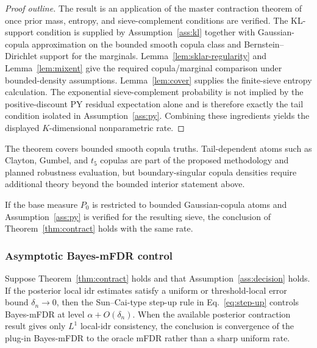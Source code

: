 \begin{proof}[Proof outline]
The result is an application of the master contraction theorem of \citet{GhosalvdV2017} once prior mass, entropy, and sieve-complement conditions are verified. The KL-support condition is supplied by Assumption~\ref{ass:kl} together with Gaussian-copula approximation on the bounded smooth copula class and Bernstein--Dirichlet support for the marginals. Lemma~\ref{lem:sklar-regularity} and Lemma~\ref{lem:mixent} give the required copula/marginal comparison under bounded-density assumptions. Lemma~\ref{lem:cover} supplies the finite-sieve entropy calculation. The exponential sieve-complement probability is not implied by the positive-discount PY residual expectation alone and is therefore exactly the tail condition isolated in Assumption~\ref{ass:py}. Combining these ingredients yields the displayed $K$-dimensional nonparametric rate.
\end{proof}

\begin{remark}
\label{rem:bounded-scope}
The theorem covers bounded smooth copula truths. Tail-dependent atoms such as Clayton, Gumbel, and $t_5$ copulas are part of the proposed methodology and planned robustness evaluation, but boundary-singular copula densities require additional theory beyond the bounded interior statement above.
\end{remark}

\begin{corollary}
\label{cor:gauss-only}
If the base measure $P_0$ is restricted to bounded Gaussian-copula atoms and Assumption~\ref{ass:py} is verified for the resulting sieve, the conclusion of Theorem~\ref{thm:contract} holds with the same rate.
\end{corollary}

\subsubsection{Asymptotic Bayes-mFDR control}

\begin{theorem}
\label{thm:fdr}
Suppose Theorem~\ref{thm:contract} holds and that Assumption~\ref{ass:decision} holds. If the posterior local idr estimates satisfy a uniform or threshold-local error bound $\delta_n\to0$, then the Sun--Cai-type step-up rule in Eq.~\eqref{eq:step-up} controls Bayes-mFDR at level $\alpha+O(\delta_n)$. When the available posterior contraction result gives only $L^1$ local-idr consistency, the conclusion is convergence of the plug-in Bayes-mFDR to the oracle mFDR rather than a sharp uniform rate.
\end{theorem}

